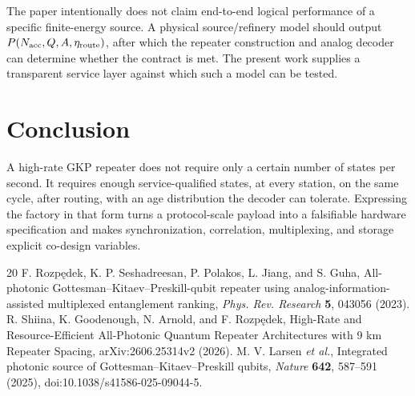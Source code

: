 \documentclass[aps,prx,reprint,superscriptaddress,nofootinbib,longbibliography,floatfix]{revtex4-2}
\begin{document}
The paper intentionally does not claim end-to-end logical performance of a specific finite-energy source. A physical source/refinery model should output $P(N_{\rm acc},Q,A,\eta_{\rm route})$, after which the repeater construction and analog decoder can determine whether the contract is met. The present work supplies a transparent service layer against which such a model can be tested.

\section{Conclusion}
A high-rate GKP repeater does not require only a certain number of states per second. It requires enough service-qualified states, at every station, on the same cycle, after routing, with an age distribution the decoder can tolerate. Expressing the factory in that form turns a protocol-scale payload into a falsifiable hardware specification and makes synchronization, correlation, multiplexing, and storage explicit co-design variables.

\begin{thebibliography}{20}
 F. Rozp\k{e}dek, K. P. Seshadreesan, P. Polakos, L. Jiang, and S. Guha, All-photonic Gottesman--Kitaev--Preskill-qubit repeater using analog-information-assisted multiplexed entanglement ranking, \emph{Phys. Rev. Research} \textbf{5}, 043056 (2023).
 R. Shiina, K. Goodenough, N. Arnold, and F. Rozp\k{e}dek, High-Rate and Resource-Efficient All-Photonic Quantum Repeater Architectures with 9 km Repeater Spacing, arXiv:2606.25314v2 (2026).
 M. V. Larsen \emph{et al.}, Integrated photonic source of Gottesman--Kitaev--Preskill qubits, \emph{Nature} \textbf{642}, 587--591 (2025), doi:10.1038/s41586-025-09044-5.
\end{thebibliography}
\end{document}
